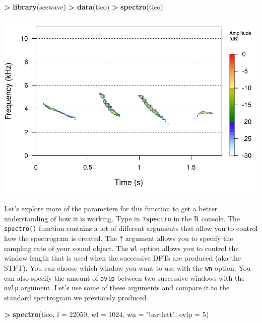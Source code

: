 \documentclass[
]{krantz}
\makeatletter
\newenvironment{Shaded}{\begin{snugshade}}{\end{snugshade}}
\newcommand{\DataTypeTok}[1]{\textcolor[rgb]{0.27,0.27,0.27}{#1}}
\newcommand{\DecValTok}[1]{\textcolor[rgb]{0.06,0.06,0.06}{#1}}
\newcommand{\KeywordTok}[1]{\textcolor[rgb]{0.27,0.27,0.27}{\textbf{#1}}}
\newcommand{\NormalTok}[1]{#1}
\newcommand{\OperatorTok}[1]{\textcolor[rgb]{0.43,0.43,0.43}{\textbf{#1}}}
\newcommand{\StringTok}[1]{\textcolor[rgb]{0.5,0.5,0.5}{#1}}
\newenvironment{kframe}{%
\medskip{}
\setlength{\fboxsep}{.8em}
 \def\at@end@of@kframe{}%
 \ifinner\ifhmode%
  \def\at@end@of@kframe{\end{minipage}}%
  \begin{minipage}{\columnwidth}%
 \fi\fi%
 \def\FrameCommand##1{\hskip\@totalleftmargin \hskip-\fboxsep
 \colorbox{shadecolor}{##1}\hskip-\fboxsep
     \hskip-\linewidth \hskip-\@totalleftmargin \hskip\columnwidth}%
 \MakeFramed {\advance\hsize-\width
   \@totalleftmargin\z@ \linewidth\hsize
   \@setminipage}}%
 {\par\unskip\endMakeFramed%
 \at@end@of@kframe}
\renewenvironment{Shaded}{\begin{kframe}}{\end{kframe}}
\makeatother
\begin{document}
\begin{Shaded}
\begin{Highlighting}[]
\OperatorTok{\textgreater{}}\StringTok{ }\KeywordTok{library}\NormalTok{(seewave)}
\OperatorTok{\textgreater{}}\StringTok{ }\KeywordTok{data}\NormalTok{(tico)}
\OperatorTok{\textgreater{}}\StringTok{ }\KeywordTok{spectro}\NormalTok{(tico)}
\end{Highlighting}
\end{Shaded}

\includegraphics[width=1\linewidth]{bookdown_files/figure-latex/unnamed-chunk-330-1}

Let's explore more of the parameters for this function to get a better understanding of how it is working. Type in \texttt{?spectro} in the R console. The \texttt{spectro()} function contains a lot of different arguments that allow you to control how the spectrogram is created. The \texttt{f} argument allows you to specify the sampling rate of your sound object. The \texttt{wl} option allows you to control the window length that is used when the successive DFTs are produced (aka the STFT). You can choose which window you want to use with the \texttt{wn} option. You can also specify the amount of \texttt{ovlp} between two successive windows with the \texttt{ovlp} argument. Let's use some of these arguments and compare it to the standard spectrogram we previously produced.

\begin{Shaded}
\begin{Highlighting}[]
\OperatorTok{\textgreater{}}\StringTok{ }\KeywordTok{spectro}\NormalTok{(tico, }\DataTypeTok{f =} \DecValTok{22050}\NormalTok{, }\DataTypeTok{wl =} \DecValTok{1024}\NormalTok{, }\DataTypeTok{wn =} \StringTok{"bartlett"}\NormalTok{, }\DataTypeTok{ovlp =} \DecValTok{5}\NormalTok{)}
\end{Highlighting}
\end{Shaded}
\end{document}
